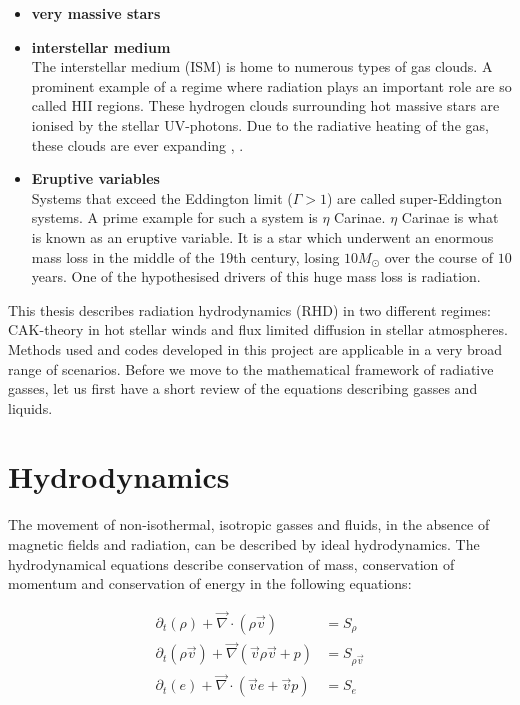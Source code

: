 \begin{itemize}
\item \textbf{very massive stars}\\

\item \textbf{interstellar medium}\\
The interstellar medium (ISM) is home to numerous types of gas clouds. A prominent example of a regime where radiation plays an important role are so called HII regions. These hydrogen clouds surrounding hot massive stars are ionised by the stellar UV-photons. Due to the radiative heating of the gas, these clouds are ever expanding \cite{ISM course notes}, \cite{Klaassen2017}. 

\item \textbf{Eruptive variables}\\
Systems that exceed the Eddington limit ($\Gamma > 1$) are called super-Eddington systems. A prime example for such a system is $\eta$ Carinae. $\eta$ Carinae is what is known as an eruptive variable. It is a star which underwent an enormous mass loss in the middle of the 19th century, losing $10 M_\odot$ over the course of $10$ years. One of the hypothesised drivers of this huge mass loss is radiation.
\end{itemize}


This thesis describes radiation hydrodynamics (RHD) in two different regimes: CAK-theory in hot stellar winds and flux limited diffusion in stellar atmospheres. Methods used and codes developed in this project are applicable in a very broad range of scenarios. Before we move to the mathematical framework of radiative gasses, let us first have a short review of the equations describing gasses and liquids.\\


\section{Hydrodynamics}
The movement of non-isothermal, isotropic gasses and fluids, in the absence of magnetic fields and radiation, can be described by ideal hydrodynamics. The hydrodynamical equations describe conservation of mass, conservation of momentum and conservation of energy in the following equations:

\begin{align}
 \partial_t \left(\rho \right) + \vec{\nabla} \cdot \left( \rho \vec{v}  \right) &= S_\rho \label{eq: hd_rho}\\
 \partial_t \left(\rho \vec{v} \right) + \vec{\nabla} \left( \vec{v} \rho \vec{v} + p \right) &= S_{\rho \vec{v}} \label{eq: hd_mom}\\
 \partial_t \left(e \right) + \vec{\nabla} \cdot \left( \vec{v} e + \vec{v} p \right) &= S_e \label{eq: hd_e}
\end{align}

